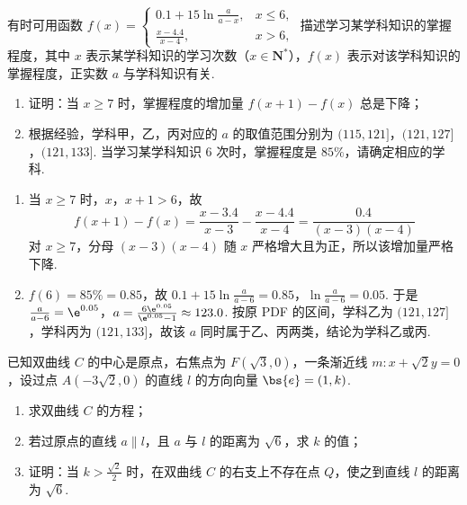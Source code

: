 \begin{problem}
有时可用函数 \(f(x) = \begin{cases}
0.1 + 15 \ln \frac{a}{a - x}, & x \leqslant 6,\\
\frac{x - 4.4}{x - 4}, & x > 6,
\end{cases}\) 描述学习某学科知识的掌握程度，其中 \(x\) 表示某学科知识的学习次数（\(x \in \mathbf{N}^*\)），\(f(x)\) 表示对该学科知识的掌握程度，正实数 \(a\) 与学科知识有关.

\begin{enumerate}
\item 证明：当 \(x \geqslant 7\) 时，掌握程度的增加量 \(f(x + 1) - f(x)\) 总是下降；

\item 根据经验，学科甲，乙，丙对应的 \(a\) 的取值范围分别为 \((115, 121]\)，\((121, 127]\)，\((121, 133]\). 当学习某学科知识 \(6\) 次时，掌握程度是 \(85\%\)，请确定相应的学科.
\end{enumerate}
\end{problem}

\begin{solution}
\begin{enumerate}
\item 当 \(x\geqslant7\) 时，\(x\)，\(x+1>6\)，故
  \[
  f(x+1)-f(x)=\frac{x-3.4}{x-3}-\frac{x-4.4}{x-4}
  =\frac{0.4}{(x-3)(x-4)}
  \]
  对 \(x\geqslant7\)，分母 \((x-3)(x-4)\) 随 \(x\) 严格增大且为正，所以该增加量严格下降.
\item \(f(6)=85\%=0.85\)，故
\(0.1+15\ln\frac{a}{a-6}=0.85\)，\(\ln\frac{a}{a-6}=0.05\).
  于是
\(\frac{a}{a-6}=\e^{0.05}\)，\(a=\frac{6\e^{0.05}}{\e^{0.05}-1}\approx123.0\).
  按原 PDF 的区间，学科乙为 \((121,127]\)，学科丙为 \((121,133]\)，故该 \(a\) 同时属于乙、丙两类，结论为学科乙或丙.
\end{enumerate}
\end{solution}

\begin{problem}
已知双曲线 \(C\) 的中心是原点，右焦点为 \(F(\sqrt{3}, 0)\)，一条渐近线 \(m: x + \sqrt{2}y = 0\)，设过点 \(A(-3\sqrt{2}, 0)\) 的直线 \(l\) 的方向向量 \(\bs{e} = (1, k)\).

\begin{enumerate}
\item 求双曲线 \(C\) 的方程；

\item 若过原点的直线 \(a \parallel l\)，且 \(a\) 与 \(l\) 的距离为 \(\sqrt{6}\)，求 \(k\) 的值；

\item 证明：当 \(k > \frac{\sqrt{2}}{2}\) 时，在双曲线 \(C\) 的右支上不存在点 \(Q\)，使之到直线 \(l\) 的距离为 \(\sqrt{6}\).
\end{enumerate}
\end{problem}


